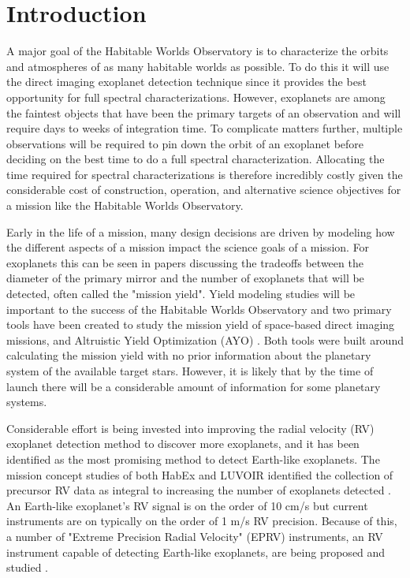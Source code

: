 \section{Introduction}
A major goal of the Habitable Worlds Observatory is to characterize the orbits
and atmospheres of as many habitable worlds as possible. To do this it will use
the direct imaging exoplanet detection technique since it provides the best
opportunity for full spectral characterizations. However, exoplanets are among
the faintest objects that have been the primary targets of an observation and
will require days to weeks of integration time. To complicate matters further,
multiple observations will be required to pin down the orbit of an exoplanet
before deciding on the best time to do a full spectral characterization.
Allocating the time required for spectral characterizations is therefore
incredibly costly given the considerable cost of construction, operation, and
alternative science objectives for a mission like the Habitable Worlds
Observatory.

Early in the life of a mission, many design decisions are driven by modeling
how the different aspects of a mission impact the science goals of a mission.
For exoplanets this can be seen in papers discussing the tradeoffs between the
diameter of the primary mirror and the number of exoplanets  that will be
detected, often called the "mission yield". Yield modeling studies will be
important to the success of the Habitable Worlds Observatory and two primary
tools have been created to study the mission yield of space-based direct
imaging missions, 
\citep{savranskyEXOSIMSExoplanetOpenSource2017} and Altruistic Yield
Optimization (AYO) \citep{starkMaximizingExoEarthCandidate2014}. Both tools
were built around calculating the mission yield with no prior information about
the planetary system of the available target stars. However, it is likely that
by the time of launch there will be a considerable amount of information for
some planetary systems.

Considerable effort is being invested into improving the radial velocity (RV)
exoplanet detection method to discover more exoplanets, and it has been
identified as the most promising method to detect Earth-like exoplanets. The
mission concept studies of both HabEx and LUVOIR identified the collection of
precursor RV data as integral to increasing the number of exoplanets detected
\citep{gaudiHabitableExoplanetObservatory2020, TheLUVOIRTeam2019}. An
Earth-like exoplanet's RV signal is on the order of 10 cm/s but current
instruments are on typically on the order of 1 m/s RV precision. Because of
this, a number of "Extreme Precision Radial Velocity" (EPRV) instruments, an RV
instrument capable of detecting Earth-like exoplanets, are being proposed and
studied \citep{Crass2021}.

